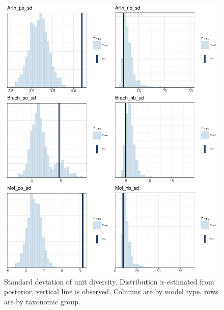 \documentclass[12pt,letterpaper]{article}
\begin{document}
\afterpage{\clearpage}
\begin{figure}[h]
  \centering
  \includegraphics[width=\textwidth,height=0.8\textheight,keepaspectratio=true]{figure/ppc_sd}
  \caption{Standard deviation of unit diversity. Distribution is estimated from posterior, vertical line is observed. Columns are by model type, rows are by taxonomic group.}
  \label{fig:ppc_sd}
\end{figure}
\end{document}
